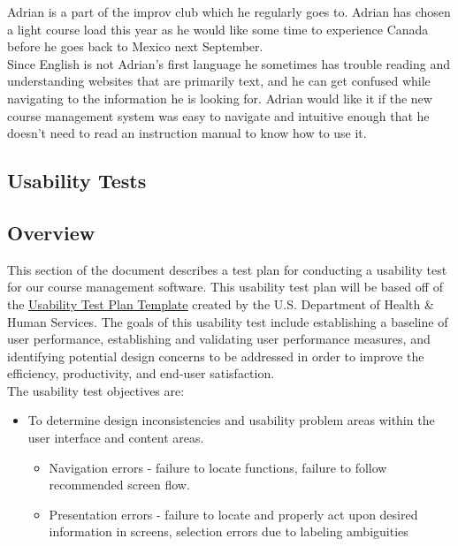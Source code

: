 \documentclass[10pt]{article}
\begin{document}
Adrian is a part of the improv club which he regularly goes to. Adrian has chosen a light course load this year as he would like some time to experience Canada before he goes back to Mexico next September.\\

Since English is not Adrian's first language he sometimes has trouble reading and understanding websites that are primarily text, and he can get confused while navigating to the information he is looking for. Adrian would like it if the new course management system was easy to navigate and intuitive enough that he doesn't need to read an instruction manual to know how to use it.

\newpage
\begin{multicols}{2}

\section*{Usability Tests}
\subsection*{Overview}
This section of the document describes a test plan for conducting a usability test for our course management software. This usability test plan will be based off of the \href{http://www.usability.gov/how-to-and-tools/resources/templates/usability-test-plan-template.html}{\underline{Usability Test Plan Template}} created by the U.S. Department of Health \& Human Services. The goals of this usability test include establishing a baseline of user performance, establishing and validating user performance measures, and identifying potential design concerns to be addressed in order to improve the efficiency, productivity, and end-user satisfaction.\\

The usability test objectives are:
\begin{itemize}
\item To determine design inconsistencies and usability problem areas within the user interface and content areas. 

	\begin{itemize}
	\item Navigation errors - failure to locate functions, failure to follow recommended screen flow.
	\item Presentation errors - failure to locate and properly act upon desired information in screens, selection errors due to 				labeling ambiguities
	\end{itemize}
	

\end{itemize}
\end{multicols}
\end{document}
